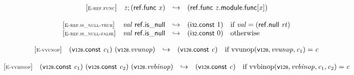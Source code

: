 \vspace{1ex}

$$
\begin{array}{@{}l@{}lcl@{}l@{}}
{[\textsc{\scriptsize E{-}ref.func}]} \quad & {\mathit{z}} ; (\mathsf{ref.func}~{\mathit{x}}) &\hookrightarrow& (\mathsf{ref.func}~{\mathit{z}}.\mathsf{module}.\mathsf{func}{}[{\mathit{x}}]) &  \\
\end{array}
$$

\vspace{1ex}

$$
\begin{array}{@{}l@{}lcl@{}l@{}}
{[\textsc{\scriptsize E{-}ref.is\_null{-}true}]} \quad & {\mathit{val}}~\mathsf{ref.is\_null} &\hookrightarrow& (\mathsf{i{\scriptstyle32}}.\mathsf{const}~1) &\quad
  \mbox{if}~{\mathit{val}} = (\mathsf{ref.null}~{\mathit{rt}}) \\
{[\textsc{\scriptsize E{-}ref.is\_null{-}false}]} \quad & {\mathit{val}}~\mathsf{ref.is\_null} &\hookrightarrow& (\mathsf{i{\scriptstyle32}}.\mathsf{const}~0) &\quad
  \mbox{otherwise} \\
\end{array}
$$

\vspace{1ex}

$$
\begin{array}{@{}l@{}lcl@{}l@{}}
{[\textsc{\scriptsize E{-}vvunop}]} \quad & (\mathsf{v{\scriptstyle128}}.\mathsf{const}~{\mathit{c}}_{{1}})~(\mathsf{v{\scriptstyle128}} . {\mathit{vvunop}}) &\hookrightarrow& (\mathsf{v{\scriptstyle128}}.\mathsf{const}~{\mathit{c}}) &\quad
  \mbox{if}~{\mathrm{vvunop}}(\mathsf{v{\scriptstyle128}}, {\mathit{vvunop}}, {\mathit{c}}_{{1}}) = {\mathit{c}} \\
\end{array}
$$

\vspace{1ex}

$$
\begin{array}{@{}l@{}lcl@{}l@{}}
{[\textsc{\scriptsize E{-}vvbinop}]} \quad & (\mathsf{v{\scriptstyle128}}.\mathsf{const}~{\mathit{c}}_{{1}})~(\mathsf{v{\scriptstyle128}}.\mathsf{const}~{\mathit{c}}_{{2}})~(\mathsf{v{\scriptstyle128}} . {\mathit{vvbinop}}) &\hookrightarrow& (\mathsf{v{\scriptstyle128}}.\mathsf{const}~{\mathit{c}}) &\quad
  \mbox{if}~{\mathrm{vvbinop}}(\mathsf{v{\scriptstyle128}}, {\mathit{vvbinop}}, {\mathit{c}}_{{1}}, {\mathit{c}}_{{2}}) = {\mathit{c}} \\
\end{array}
$$

